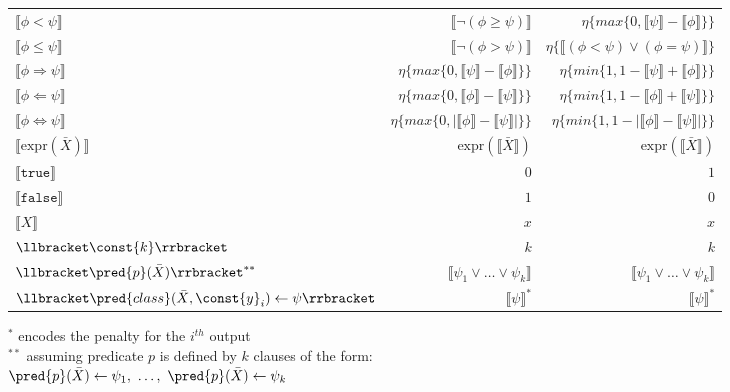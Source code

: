 \begin{table}
\begin{tabular}{l|r|r}
        $\llbracket\phi < \psi\rrbracket$  &  $\llbracket \neg ( \phi \geq \psi )\rrbracket$ &  $\eta\{max\{0, \llbracket\psi\rrbracket - \llbracket\phi\rrbracket\}\}$
        \\
        $\llbracket\phi \le \psi\rrbracket$  & $\llbracket \neg ( \phi > \psi )\rrbracket$ & $\eta\{\llbracket( \phi < \psi ) \vee ( \phi = \psi )\rrbracket\}$
        \\
        $\llbracket\phi \Rightarrow \psi\rrbracket$ & $\eta\{max\{0, \llbracket\psi\rrbracket-\llbracket\phi\rrbracket\}\}$ & $\eta\{min\{1, 1- \llbracket\psi\rrbracket+\llbracket\phi\rrbracket\}\}$
         \\
        $\llbracket\phi \Leftarrow \psi\rrbracket$ & $\eta\{max\{0, \llbracket\phi\rrbracket-\llbracket\psi\rrbracket\}\}$ & $\eta\{min\{1, 1-\llbracket\phi\rrbracket+\llbracket\psi\rrbracket\}\}$ 
        \\
        $\llbracket\phi \Leftrightarrow \psi\rrbracket$ & $\eta\{max\{0, |\llbracket\phi\rrbracket-\llbracket\psi\rrbracket|\}\}$ & $\eta\{min\{1, 1-|\llbracket\phi\rrbracket-\llbracket\psi\rrbracket|\}\}$ 
        \\
        $\llbracket \text{expr}(\bar{X}) \rrbracket$ & $\text{expr}(\llbracket\bar{X}\rrbracket)$ & $\text{expr}(\llbracket\bar{X}\rrbracket)$
        \\
        $\llbracket \mathtt{true} \rrbracket$ & $0$ & $1$
        \\
        $\llbracket \mathtt{false} \rrbracket$ & $1$  & $0$
        \\
        $\llbracket X \rrbracket$ & $x$ & $x$
        \\
        $\llbracket \const{k} \rrbracket$ & $k$ & $k$
        \\
        $\llbracket \pred{p}(\bar{X}) \rrbracket^{**}$ & $\llbracket \psi_1 \vee \ldots \vee \psi_k \rrbracket$ & $\llbracket \psi_1 \vee \ldots \vee \psi_k \rrbracket$
        \\
        $\llbracket \pred{class}(\bar{X}, \const{y}_i) \leftarrow \psi \rrbracket$ & $\llbracket \psi \rrbracket^{*}$ & $\llbracket \psi \rrbracket^{*}$
    \end{tabular}
    \begin{center}\scriptsize
        $^{*}$ encodes the penalty for the $i^{th}$ output
        \\
        \smallskip
        $^{**}$ assuming predicate $p$ is defined by $k$ clauses of the form:
        \\
        $\pred{p}(\bar{X}) \leftarrow \psi_1,\ \ldots,\ \pred{p}(\bar{X}) \leftarrow \psi_k$
    \end{center}
\end{table}